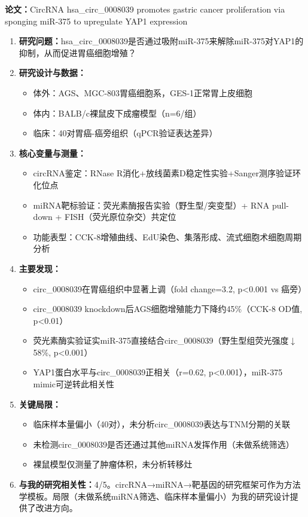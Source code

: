 \begin{aibox}
\textbf{论文：}CircRNA hsa\_circ\_0008039 promotes gastric cancer proliferation via sponging miR-375 to upregulate YAP1 expression

\begin{enumerate}[nosep,leftmargin=*]
\item \textbf{研究问题：}hsa\_circ\_0008039是否通过吸附miR-375来解除miR-375对YAP1的抑制，从而促进胃癌细胞增殖？

\item \textbf{研究设计与数据：}
  \begin{itemize}[nosep]
  \item 体外：AGS、MGC-803胃癌细胞系，GES-1正常胃上皮细胞
  \item 体内：BALB/c裸鼠皮下成瘤模型（n=6/组）
  \item 临床：40对胃癌-癌旁组织（qPCR验证表达差异）
  \end{itemize}

\item \textbf{核心变量与测量：}
  \begin{itemize}[nosep]
  \item circRNA鉴定：RNase R消化+放线菌素D稳定性实验+Sanger测序验证环化位点
  \item miRNA靶标验证：荧光素酶报告实验（野生型/突变型）+ RNA pull-down + FISH（荧光原位杂交）共定位
  \item 功能表型：CCK-8增殖曲线、EdU染色、集落形成、流式细胞术细胞周期分析
  \end{itemize}

\item \textbf{主要发现：}
  \begin{itemize}[nosep]
  \item circ\_0008039在胃癌组织中显著上调（fold change=3.2, p<0.001 vs 癌旁）
  \item circ\_0008039 knockdown后AGS细胞增殖能力下降约45\%（CCK-8 OD值, p<0.01）
  \item 荧光素酶实验证实miR-375直接结合circ\_0008039（野生型组荧光强度\(\downarrow\)58\%, p<0.001）
  \item YAP1蛋白水平与circ\_0008039正相关（r=0.62, p<0.001），miR-375 mimic可逆转此相关性
  \end{itemize}

\item \textbf{关键局限：}
  \begin{itemize}[nosep]
  \item 临床样本量偏小（40对），未分析circ\_0008039表达与TNM分期的关联
  \item 未检测circ\_0008039是否还通过其他miRNA发挥作用（未做系统筛选）
  \item 裸鼠模型仅测量了肿瘤体积，未分析转移灶
  \end{itemize}

\item \textbf{与我的研究相关性：}4/5。circRNA→miRNA→靶基因的研究框架可作为方法学模板。局限（未做系统miRNA筛选、临床样本量偏小）为我的研究设计提供了改进方向。
\end{enumerate}
\end{aibox}

